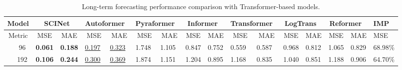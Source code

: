 \documentclass{article}
\begin{document}
\begin{table*}[h]
\caption{Long-term forecasting performance comparison with Transformer-based models. }
\centering
\scriptsize
\resizebox{\textwidth}{!}
{
\begin{tabular}{ccllllllllllllll|l}
\hline
\multicolumn{2}{c}{Model}                                                     & \multicolumn{2}{c}{\textbf{SCINet}}                                    & \multicolumn{2}{c}{Autoformer~\cite{Wu2021AutoformerDT}}   & \multicolumn{2}{c}{Pyraformer~\cite{Liu2022Pyraformer}}                                          & \multicolumn{2}{c}{Informer~\cite{Zhou2020InformerBE}}                      & \multicolumn{2}{c}{Transformer~\cite{vaswani2017attention}}                   & \multicolumn{2}{c}{LogTrans~\cite{li2019enhancing}}                      & \multicolumn{2}{c|}{Reformer~\cite{kitaev2019reformer}} & \textbf{IMP}                               \\ \hline
\multicolumn{2}{c}{Metric}                                                                           & \multicolumn{1}{c}{MSE}            & \multicolumn{1}{c}{MAE}           & \multicolumn{1}{c}{MSE}            & \multicolumn{1}{c}{MAE} & \multicolumn{1}{c}{MSE}            & \multicolumn{1}{c}{MAE}            & \multicolumn{1}{c}{MSE} & \multicolumn{1}{c}{MAE} & \multicolumn{1}{c}{MSE} & \multicolumn{1}{c}{MAE} & \multicolumn{1}{c}{MSE} & \multicolumn{1}{c}{MAE} & \multicolumn{1}{c}{MSE}  & \multicolumn{1}{c|}{MAE}  & MSE \\ \hline
\multicolumn{1}{c|}{}                                                                          & 96  & \textbf{0.061}                     & \textbf{0.188}                    & {\color[RGB]{0, 100, 148} \underline{0.197}} & {\color[RGB]{0, 100, 148} \underline{0.323}}  & 1.748 &  1.105& 0.847                   & 0.752                   & 0.559                   & 0.587                   & 0.968                   & 0.812                   & 1.065                    & 0.829                     & {\color[RGB]{230, 57, 70} 68.98\%}   \\
\multicolumn{1}{c|}{}                                                                          & 192 & \textbf{0.106}                     & \textbf{0.244}                    & {\color[RGB]{0, 100, 148} \underline{0.300}} & {\color[RGB]{0, 100, 148} \underline{0.369}}  &  1.874 &  1.151& 1.204                   & 0.895                   & 1.168                   & 0.835                   & 1.040                   & 0.851                   & 1.188                    & 0.906                     & {\color[RGB]{230, 57, 70} 64.70\%}   \\

\end{tabular}}
\end{table*}
\end{document}
